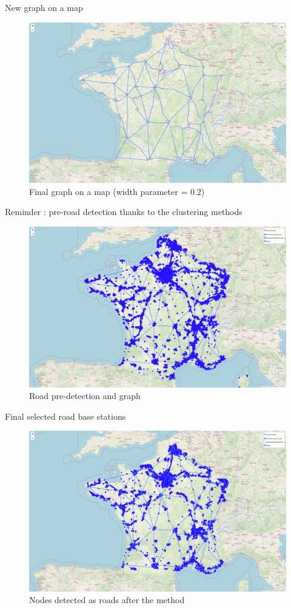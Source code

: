 \begin{frame}{New graph on a map}
    \begin{figure}
        \includegraphics[height=0.6\paperheight]{images/road_detection/final graph on map.png}
        \caption{Final graph on a map (width parameter = $0.2$)}
    \end{figure}
\end{frame}

\begin{frame}{Reminder : pre-road detection thanks to the clustering methods}
    \begin{figure}
        \includegraphics[height=0.6\paperheight]{images/road_detection/road-predetection and graph.png}
        \caption{Road pre-detection and graph}
    \end{figure}
\end{frame}

\begin{frame}{Final selected road base stations}
    \begin{figure}
        \includegraphics[height=0.6\paperheight]{images/road_detection/roads detected.png}
        \caption{Nodes detected as roads after the method}
    \end{figure}
\end{frame}
